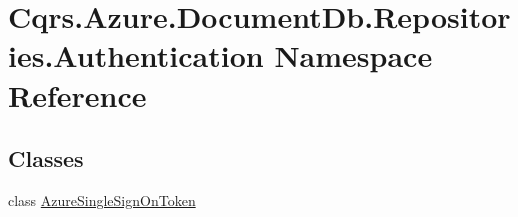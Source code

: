 \hypertarget{namespaceCqrs_1_1Azure_1_1DocumentDb_1_1Repositories_1_1Authentication}{}\section{Cqrs.\+Azure.\+Document\+Db.\+Repositories.\+Authentication Namespace Reference}
\label{namespaceCqrs_1_1Azure_1_1DocumentDb_1_1Repositories_1_1Authentication}
\subsection*{Classes}
\begin{DoxyCompactItemize}
\item 
class \hyperlink{classCqrs_1_1Azure_1_1DocumentDb_1_1Repositories_1_1Authentication_1_1AzureSingleSignOnToken}{Azure\+Single\+Sign\+On\+Token}
\end{DoxyCompactItemize}
